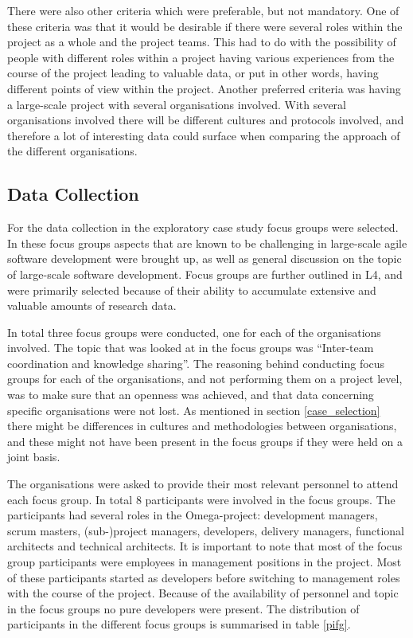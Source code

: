 There were also other criteria which were preferable, but not mandatory. One of these criteria was that it would be desirable if there were several roles within the project as a whole and the project teams. This had to do with the possibility of people with different roles within a project having various experiences from the course of the project leading to valuable data, or put in other words, having different points of view within the project. Another preferred criteria was having a large-scale project with several organisations involved. With several organisations involved there will be different cultures and protocols involved, and therefore a lot of interesting data could surface when comparing the approach of the different organisations.

\subsection{Data Collection}

For the data collection in the exploratory case study focus groups were selected. In these focus groups aspects that are known to be challenging in large-scale agile software development were brought up, as well as general discussion on the topic of large-scale software development. Focus groups are further outlined in L4, and were primarily selected because of their ability to accumulate extensive and valuable amounts of research data.


In total three focus groups were conducted, one for each of the organisations involved. The topic that was looked at in the focus groups was ``Inter-team coordination and knowledge sharing''. The reasoning behind conducting focus groups for each of the organisations, and not performing them on a project level, was to make sure that an openness was achieved, and that data concerning specific organisations were not lost. As mentioned in section \ref{case_selection} there might be differences in cultures and methodologies between organisations, and these might not have been present in the focus groups if they were held on a joint basis.

The organisations were asked to provide their most relevant personnel to attend each focus group. In total 8 participants were involved in the focus groups. The participants had several roles in the Omega-project: development managers, scrum masters, (sub-)project managers, developers, delivery managers, functional architects and technical architects. It is important to note that most of the focus group participants were employees in management positions in the project. Most of these participants started as developers before switching to management roles with the course of the project. Because of the availability of personnel and topic in the focus groups no pure developers were present. The distribution of participants in the different focus groups is summarised in table \ref{pifg}.

